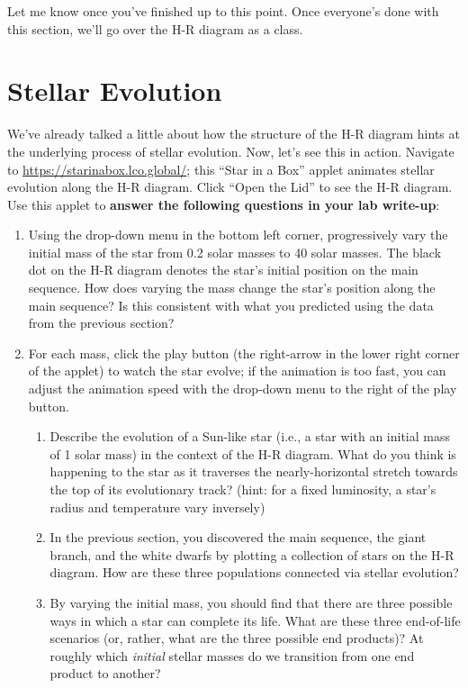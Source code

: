 \documentclass[11pt]{article}
\begin{document}
\medskip \noindent
Let me know once you've finished up to this point. Once everyone's done with this section, we'll go over the H-R diagram as a class.

\section{Stellar Evolution}
We've already talked a little about how the structure of the H-R diagram hints at the underlying process of stellar evolution. Now, let's see this in action. Navigate to \url{https://starinabox.lco.global/}; this ``Star in a Box'' applet animates stellar evolution along the H-R diagram. Click ``Open the Lid'' to see the H-R diagram. Use this applet to \textbf{answer the following questions in your lab write-up}:
\begin{enumerate}
    \item Using the drop-down menu in the bottom left corner, progressively vary the initial mass of the star from 0.2 solar masses to 40 solar masses. The black dot on the H-R diagram denotes the star's initial position on the main sequence. How does varying the mass change the star's position along the main sequence? Is this consistent with what you predicted using the data from the previous section?
    
    \item For each mass, click the play button (the right-arrow in the lower right corner of the applet) to watch the star evolve; if the animation is too fast, you can adjust the animation speed with the drop-down menu to the right of the play button.
    \begin{enumerate}
    
        \item Describe the evolution of a Sun-like star (i.e., a star with an initial mass of 1 solar mass) in the context of the H-R diagram. What do you think is happening to the star as it traverses the nearly-horizontal stretch towards the top of its evolutionary track? (hint: for a fixed luminosity, a star's radius and temperature vary inversely)  
        
        \item In the previous section, you discovered the main sequence, the giant branch, and the white dwarfs by plotting a collection of stars on the H-R diagram. How are these three populations connected via stellar evolution?
        
        \item By varying the initial mass, you should find that there are three possible ways in which a star can complete its life. What are these three end-of-life scenarios (or, rather, what are the three possible end products)? At roughly which \emph{initial} stellar masses do we transition from one end product to another?
        

\end{enumerate}
\end{enumerate}
\end{document}
